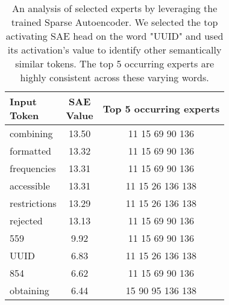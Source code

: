 \begin{table}[]
    \centering
    \begin{tabular}{lcc}
        \makecell{Input \\ Token} & \makecell{SAE \\ Value}  & Top 5 occurring experts \\
        \toprule
        combining & 13.50 & 11 \hfill 15 \hfill 69 \hfill 90 \hfill 136\\
        formatted & 13.32 & 11 \hfill 15 \hfill 69 \hfill 90 \hfill 136\\
        frequencies & 13.31 & 11 \hfill 15 \hfill 69 \hfill 90 \hfill 136\\
        accessible & 13.31 & 11 \hfill 15 \hfill 26 \hfill 136 \hfill 138\\
        restrictions & 13.29 & 11 \hfill 15 \hfill 26 \hfill 136 \hfill 138\\
        rejected & 13.13 & 11 \hfill 15 \hfill 69 \hfill 90 \hfill 136\\
        559 & 9.92 & 11 \hfill 15 \hfill 69 \hfill 90 \hfill 136\\
        UUID & 6.83 & 11 \hfill 15 \hfill 26 \hfill 136 \hfill 138\\
        854 & 6.62 & 11 \hfill 15 \hfill 69 \hfill 90 \hfill 136\\
        obtaining & 6.44 & 15 \hfill 90 \hfill 95 \hfill 136 \hfill 138\\
        \bottomrule
    \end{tabular}
    \caption{An analysis of selected experts by leveraging the trained Sparse Autoencoder. We selected the top activating SAE head on the word "UUID" and used its activation's value to identify other semantically similar tokens. The top 5 occurring experts are highly consistent across these varying words.}
    \label{tab:sae_uuid}
\end{table}


